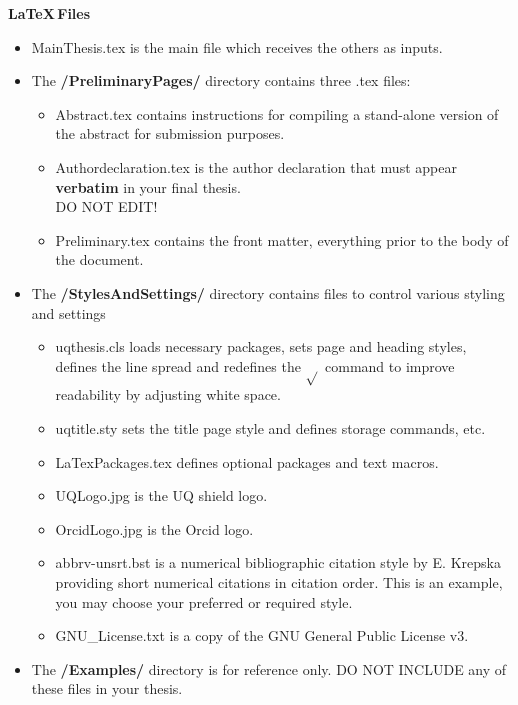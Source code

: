 \vspace{0.4em}

\noindent
\textbf{\large \LaTeX \,Files}

\begin{itemize}
    \item MainThesis.tex is the main file which receives the others as inputs.
        \item The \textbf{/PreliminaryPages/} directory contains three .tex files: 
        \begin{itemize}[after=\vspace{0pt}]
        \item Abstract.tex contains instructions for compiling a stand-alone version of the abstract for submission purposes.
        \item Authordeclaration.tex is the author declaration that must appear \textbf{verbatim} in your final thesis. \\ DO NOT EDIT!
        \item Preliminary.tex contains the front matter, everything prior to the body of the document.     
        \end{itemize}
    \item The \textbf{/StylesAndSettings/} directory contains files to control various styling and settings
        \begin{itemize}[after=\vspace{0pt}] 
        \item uqthesis.cls loads necessary packages, sets page and heading styles, defines the line spread and redefines the $\sqrt{}$ command to improve readability by adjusting white space.
        \item uqtitle.sty sets the title page style and defines storage commands, etc.
        \item LaTexPackages.tex defines optional packages and text macros.
        \item UQLogo.jpg is the UQ shield logo.
        \item OrcidLogo.jpg is the Orcid logo.
        \item abbrv-unsrt.bst is a numerical bibliographic citation style by E. Krepska providing short numerical citations in citation order. This is an example, you may choose your preferred or required style.
        \item GNU\_License.txt is a copy of the GNU General Public License v3.
        \end{itemize}


    \item The \textbf{/Examples/} directory is for reference only. DO NOT INCLUDE any of these files in your thesis.
\end{itemize}


